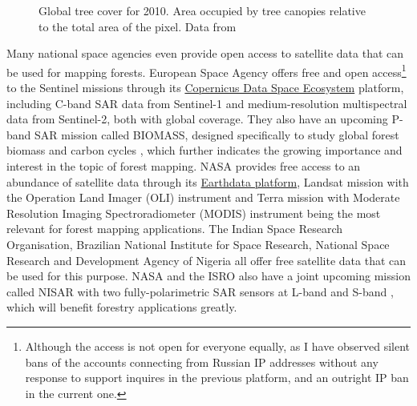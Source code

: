 \begin{figure}
\caption[Global tree cover map]{\label{fig-forest-coverage}Global tree cover for 2010. Area occupied by tree canopies relative to the total area of the pixel. Data from \citet{hansenHighResolutionGlobalMaps2013}
}
\end{figure}

Many national space agencies even provide open access to satellite data that can be used for mapping forests.
European Space Agency offers free and open access\footnote{Although the access is not open for everyone equally, as I have observed silent bans of the accounts connecting from Russian IP addresses without any response to support inquires in the previous platform, and an outright IP ban in the current one.} to the Sentinel missions through its \href{https://dataspace.copernicus.eu/}{Copernicus Data Space Ecosystem} platform, including C-band SAR data from Sentinel-1 and medium-resolution multispectral data from Sentinel-2, both with global coverage.
They also have an upcoming P-band SAR mission called BIOMASS, designed specifically to study global forest biomass and carbon cycles \citep{queganEuropeanSpaceAgency2019}, which further indicates the growing importance and interest in the topic of forest mapping.
NASA provides free access to an abundance of satellite data through its \href{https://www.earthdata.nasa.gov/}{Earthdata platform}, Landsat mission with the Operation Land Imager (OLI) instrument and Terra mission with Moderate Resolution Imaging Spectroradiometer (MODIS) instrument being the most relevant for forest mapping applications.
The Indian Space Research Organisation, Brazilian National Institute for Space Research, National Space Research and Development Agency of Nigeria all offer free satellite data that can be used for this purpose.
NASA and the ISRO also have a joint upcoming mission called NISAR with two fully-polarimetric SAR sensors at L-band and S-band \citep{kelloggNASAISROSyntheticAperture2020}, which will benefit forestry applications greatly.

